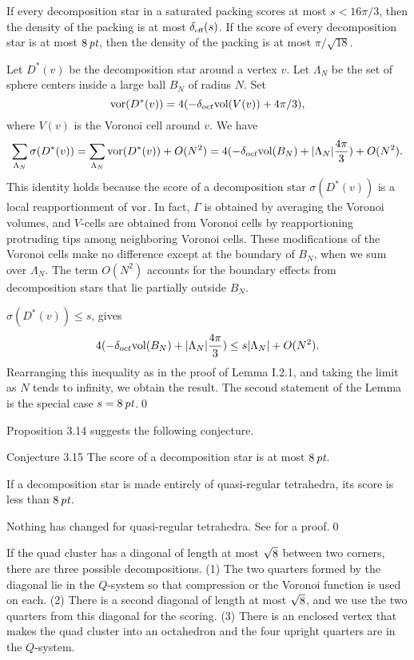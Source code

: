   If every decomposition star
in a saturated packing scores at most $s<16\pi/3$, then the density
of the packing is at most $\operatorname{\delta_{\operatorname{\scriptscriptstyle eff}}}(s)$.  If the score of every
decomposition star is at most $8\,\hbox{\it pt}$, then the density of
the packing is at most $\pi/\sqrt{18}$.\endproclaim

  Let $D^*(v)$ be the decomposition star around a
vertex $v$.  Let $\Lambda_N$ be the set of sphere centers
inside a large ball $B_N$ of radius $N$.
Set 
$$\operatorname{vor}(D^*(v))=4(-\delta_{oct}\hbox{vol}(V(v))+4\pi/3),$$
where $V(v)$ is the Voronoi cell around $v$.
We have
$$\sum_{\Lambda_N}\sigma(D^*(v)) = \sum_{\Lambda_N}
	\operatorname{vor}(D^*(v)) +O(N^2) = 4(-\delta_{oct}\hbox{vol}(B_N)+
	|\Lambda_N|{4\pi\over 3}) + O(N^2).$$
This identity holds because the score of a decomposition star
$\sigma(D^*(v))$ is a local reapportionment of $\operatorname{vor}$.
In fact, $\Gamma$ is obtained by averaging the Voronoi volumes,
and $V$-cells are obtained from Voronoi cells
by reapportioning protruding tips
among neighboring Voronoi cells.  These modifications of the
Voronoi cells make no difference except at the boundary of $B_N$,
when we sum over $\Lambda_N$.  The term $O(N^2)$ accounts for
the boundary effects from decomposition stars that lie partially
outside $B_N$. 

$\sigma(D^*(v))\le s$, gives
$$4(-\delta_{oct}\hbox{vol}(B_N) + |\Lambda_N|{4\pi\over3})\le s|\Lambda_N|+O(N^2).$$
Rearranging this inequality as in the proof of Lemma I.2.1,
and taking the limit as $N$ tends to infinity,
we obtain the result.  The second statement of the
Lemma is the special case $s = 8\,\hbox{\it pt}$.\qed\enddemo



Proposition 3.14 suggests the following conjecture.

\smallskip
\proclaim
{Conjecture 3.15}  
The score of a decomposition star is at most $8\,\hbox{\it pt}$.
\endproclaim

  If a decomposition star is made
entirely of quasi-regular tetrahedra, its score is less
than $8\,\hbox{\it pt}$.\endproclaim

 Nothing has changed for quasi-regular
tetrahedra.  See \cite{I} for a proof.\qed\enddemo

\bigskip
  If the quad cluster has a diagonal of length 
at most $\sqrt8$ between two corners,
there are three possible decompositions. 
(1) The two quarters formed by the
diagonal lie in the $Q$-system so that compression or the
Voronoi function
is used on each.  (2)  There is a second diagonal of length at most $\sqrt8$,
and we use the two quarters from this diagonal for the scoring.
(3)  There is an enclosed vertex that makes the quad cluster into
an octahedron and the four upright quarters are in the
$Q$-system.

